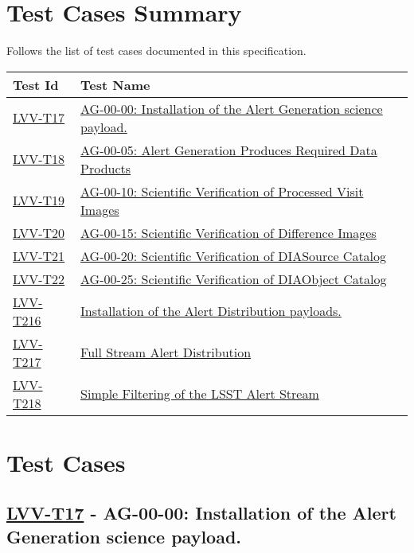 \section{Test Cases Summary}\label{test-cases-summary}

Follows the list of test cases documented in this specification.

\begin{longtable}[]{p{3cm}p{13cm}}
\toprule
Test Id & Test Name\tabularnewline
\midrule
\endhead
    \hyperref[lvv-t17]{LVV-T17} &
    \href{https://jira.lsstcorp.org/secure/Tests.jspa\#/testCase/LVV-T17}{AG-00-00: Installation of the Alert Generation science payload.} \tabularnewline
    \hyperref[lvv-t18]{LVV-T18} &
    \href{https://jira.lsstcorp.org/secure/Tests.jspa\#/testCase/LVV-T18}{AG-00-05: Alert Generation Produces Required Data Products} \tabularnewline
    \hyperref[lvv-t19]{LVV-T19} &
    \href{https://jira.lsstcorp.org/secure/Tests.jspa\#/testCase/LVV-T19}{AG-00-10: Scientific Verification of Processed Visit Images} \tabularnewline
    \hyperref[lvv-t20]{LVV-T20} &
    \href{https://jira.lsstcorp.org/secure/Tests.jspa\#/testCase/LVV-T20}{AG-00-15: Scientific Verification of Difference Images} \tabularnewline
    \hyperref[lvv-t21]{LVV-T21} &
    \href{https://jira.lsstcorp.org/secure/Tests.jspa\#/testCase/LVV-T21}{AG-00-20: Scientific Verification of DIASource Catalog} \tabularnewline
    \hyperref[lvv-t22]{LVV-T22} &
    \href{https://jira.lsstcorp.org/secure/Tests.jspa\#/testCase/LVV-T22}{AG-00-25: Scientific Verification of DIAObject Catalog} \tabularnewline
    \hyperref[lvv-t216]{LVV-T216} &
    \href{https://jira.lsstcorp.org/secure/Tests.jspa\#/testCase/LVV-T216}{Installation of the Alert Distribution payloads.} \tabularnewline
    \hyperref[lvv-t217]{LVV-T217} &
    \href{https://jira.lsstcorp.org/secure/Tests.jspa\#/testCase/LVV-T217}{Full Stream Alert Distribution} \tabularnewline
    \hyperref[lvv-t218]{LVV-T218} &
    \href{https://jira.lsstcorp.org/secure/Tests.jspa\#/testCase/LVV-T218}{Simple Filtering of the LSST Alert Stream} \tabularnewline
\bottomrule
\end{longtable}

\newpage

\section{Test Cases}

\subsection{\href{https://jira.lsstcorp.org/secure/Tests.jspa\#/testCase/LVV-T17}{LVV-T17}
    - AG-00-00: Installation of the Alert Generation science payload.}\label{lvv-t17}


